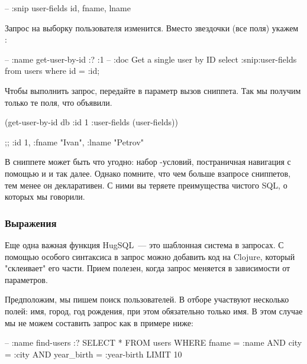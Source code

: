 \begin{english}
  \begin{sql}
-- :snip user-fields
id, fname, lname
  \end{sql}
\end{english}

Запрос на выборку пользователя изменится. Вместо звездочки (все поля) укажем :

\begin{english}
  \begin{sql}
-- :name get-user-by-id :? :1
-- :doc Get a single user by ID
select :snip:user-fields from users
where id = :id;
  \end{sql}
\end{english}

Чтобы выполнить запрос, передайте в параметр  вызов сниппета. Так мы получим только те поля, что объявили.

\begin{english}
  \begin{clojure}
(get-user-by-id db {:id 1 :user-fields (user-fields)})

;; {:id 1, :fname "Ivan", :lname "Petrov"}
  \end{clojure}
\end{english}

В сниппете может быть что угодно: набор -условий, постраничная навигация с помощью  и  и так далее. Однако помните, что чем больше взапросе сниппетов, тем менее он декларативен. С ними вы теряете преимущества чистого SQL, о которых мы говорили.

\subsubsection{Выражения}

Еще одна важная функция HugSQL~--- это шаблонная система в запросах. С помощью особого синтаксиса в запрос можно добавить код на Clojure, который "склеивает" его части. Прием полезен, когда запрос меняется в зависимости от параметров.

Предположим, мы пишем поиск пользователей. В отборе участвуют несколько полей: имя, город, год рождения, при этом обязательно только имя. В этом случае мы не можем составить запрос как в примере ниже:

\begin{english}
  \begin{sql}
-- :name find-users :?
SELECT * FROM users
WHERE fname = :name
  AND city = :city
  AND year_birth = :year-birth
LIMIT 10
  \end{sql}
\end{english}

